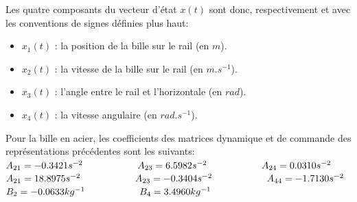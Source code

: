 Les quatre composants du vecteur d'état $x(t)$ sont donc, respectivement et avec les conventions de signes définies plus haut:

\begin{itemize} [label=,font=\small \color{black}]
  	\item  $x_1(t)$ : la position de la bille sur le rail (en $m$).
    \item  $x_2(t)$ : la vitesse de la bille sur le rail (en $m.s^{-1}$).
    \item  $x_3(t)$ : l'angle entre le rail et l'horizontale (en $rad$).
    \item  $x_4(t)$ : la vitesse  angulaire (en $rad.s^{-1}$).
	\end{itemize}

Pour la bille en acier, les coefficients des matrices dynamique et de commande des représentations précédentes sont les suivants:\\
$A_{21}= -0.3421 s^{-2} \hspace{2 cm} A_{23}= 6.5982 s^{-2} \hspace{2 cm} A_{24}= 0.0310 s^{-2} $\\
$ A_{21}= 18.8975 s^{-2} \hspace{2 cm} A_{23}= -0.3404 s^{-2} \hspace{2 cm} A_{44}= -1.7130 s^{-2} $\\
$ B_2 = -0.0633 kg^{-1} \hspace{2 cm} B_4 = 3.4960 kg^{-1}  $\\